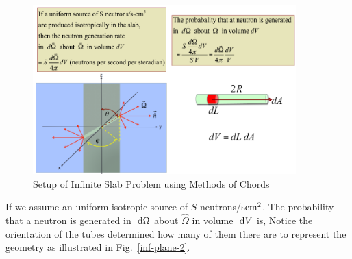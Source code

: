 \documentclass{school-22.211-notes}
\begin{document}
\begin{figure}[h]
  \centering
  \includegraphics[width=4in]{images/pin/inf-plane-1.png}
  \caption{Setup of Infinite Slab Problem using Methods of Chords} \label{inf-plane-1}
\end{figure}
 If we assume an uniform isotropic source of $S$ neutrons/$\mathrm{s}\mathrm{cm}^2$. The probability that a neutron is generated in $\mbox{ }\mathrm{d} \Omega$ about $\hat{\Omega}$ in volume $\mbox{ }\mathrm{d} V$ is, 
Notice the orientation of the tubes determined how many of them there are to represent the geometry as illustrated in Fig.~\ref{inf-plane-2}. 
\end{document}
